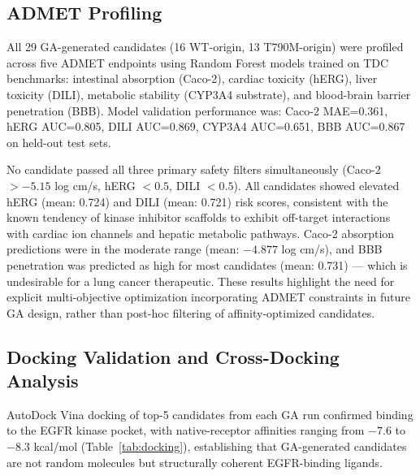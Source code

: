 \documentclass[11pt]{article}
\begin{document}
\subsection{ADMET Profiling}

All 29 GA-generated candidates (16 WT-origin, 13 T790M-origin) were profiled
across five ADMET endpoints using Random Forest models trained on TDC benchmarks:
intestinal absorption (Caco-2), cardiac toxicity (hERG), liver toxicity (DILI),
metabolic stability (CYP3A4 substrate), and blood-brain barrier penetration (BBB).
Model validation performance was: Caco-2 MAE=0.361, hERG AUC=0.805,
DILI AUC=0.869, CYP3A4 AUC=0.651, BBB AUC=0.867 on held-out test sets.

No candidate passed all three primary safety filters simultaneously
(Caco-2 $> -5.15$ log cm/s, hERG $< 0.5$, DILI $< 0.5$).
All candidates showed elevated hERG (mean: 0.724) and DILI (mean: 0.721)
risk scores, consistent with the known tendency of kinase inhibitor scaffolds
to exhibit off-target interactions with cardiac ion channels and hepatic
metabolic pathways. Caco-2 absorption predictions were in the moderate range
(mean: $-4.877$ log cm/s), and BBB penetration was predicted as high
for most candidates (mean: 0.731) --- which is undesirable for a lung cancer
therapeutic. These results highlight the need for explicit multi-objective
optimization incorporating ADMET constraints in future GA design, rather than
post-hoc filtering of affinity-optimized candidates.

\subsection{Docking Validation and Cross-Docking Analysis}

AutoDock Vina docking of top-5 candidates from each GA run confirmed binding
to the EGFR kinase pocket, with native-receptor affinities ranging from
$-7.6$ to $-8.3$ kcal/mol (Table~\ref{tab:docking}), establishing that
GA-generated candidates are not random molecules but structurally coherent
EGFR-binding ligands.
\end{document}

